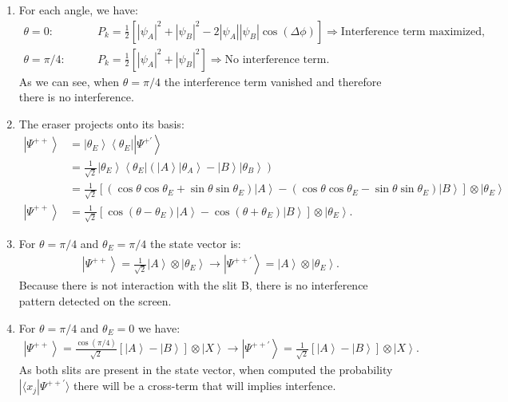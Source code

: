 \documentclass[letterpaper,11pt,twoside]{article}
\newcommand{\ket}[1]{\left|#1\right\rangle}
\newcommand{\bra}[1]{\left\langle#1\right|}
\newcommand{\braket}[1]{\langle#1\rangle}
\begin{document}
\begin{enumerate}[itemsep=0pt,topsep=0pt,parsep=0pt,label=\alph*)]
\begin{align*}
    \psi_A(x_k)=|\psi_A|\angle\theta_A,\quad\text{and}\quad\psi_B(x_k)=|\psi_B|\angle\theta_B,
  \end{align*}
  then usinging it with the projection computed we finally have:
  \begin{align*}
    P_k=|\braket{x_k|\Psi^{+'}}|^2=\frac{1}{2}\left[|\psi_A|^2+|\psi_B|^2-2\cos2\theta|\psi_A||\psi_B|\cos(\Delta\phi)\right],\quad\Delta\phi=\theta_B-\theta_A.
  \end{align*}
  \item For each angle, we have:
  \begin{align*}
    \theta=0:&\qquad P_k=\frac{1}{2}\left[|\psi_A|^2+|\psi_B|^2-2|\psi_A||\psi_B|\cos(\Delta\phi)\right]\Longrightarrow\text{Interference term maximized},\\
    \theta=\pi/4:&\qquad P_k=\frac{1}{2}\left[|\psi_A|^2+|\psi_B|^2\right]\Longrightarrow\text{No interference term}.
  \end{align*}
  As we can see, when $\theta=\pi/4$ the interference term vanished and therefore there is no interference.
  \item The eraser projects onto its basis:
  \begin{align*}
    \ket{\Psi^{++}}&=\ket{\theta_E}\bra{\theta_E}\ket{\Psi^{+'}}\\
    &=\frac{1}{\sqrt{2}}\ket{\theta_E}\bra{\theta_E}(\ket{A}\ket{\theta_A}-\ket{B}\ket{\theta_B})\\
    &=\frac{1}{\sqrt{2}}\left[(\cos\theta\cos\theta_E+\sin\theta\sin\theta_E)\ket{A}-(\cos\theta\cos\theta_E-\sin\theta\sin\theta_E)\ket{B}\right]\otimes\ket{\theta_E}\\
    \ket{\Psi^{++}}&=\frac{1}{\sqrt{2}}\left[\cos(\theta-\theta_E)\ket{A}-\cos(\theta+\theta_E)\ket{B}\right]\otimes\ket{\theta_E}.
  \end{align*}
  \item For $\theta=\pi/4$ and $\theta_E=\pi/4$ the state vector is:
  \begin{align*}
    \ket{\Psi^{++}}=\frac{1}{\sqrt{2}}\ket{A}\otimes\ket{\theta_E}\longrightarrow\ket{\Psi^{++'}}=\ket{A}\otimes\ket{\theta_E}.
  \end{align*}
  Because there is not interaction with the slit B, there is no interference pattern detected on the screen.
  \item For $\theta=\pi/4$ and $\theta_E=0$ we have:
  \begin{align*}
    \ket{\Psi^{++}}=\frac{\cos(\pi/4)}{\sqrt{2}}[\ket{A}-\ket{B}]\otimes\ket{X}\longrightarrow\ket{\Psi^{++'}}=\frac{1}{\sqrt{2}}[\ket{A}-\ket{B}]\otimes\ket{X}.
  \end{align*} 
  As both slits are present in the state vector, when computed the probability $|\braket{x_j|\Psi^{++'}}$ there will be a cross-term that will implies interfence.
\end{enumerate}
\end{document}
